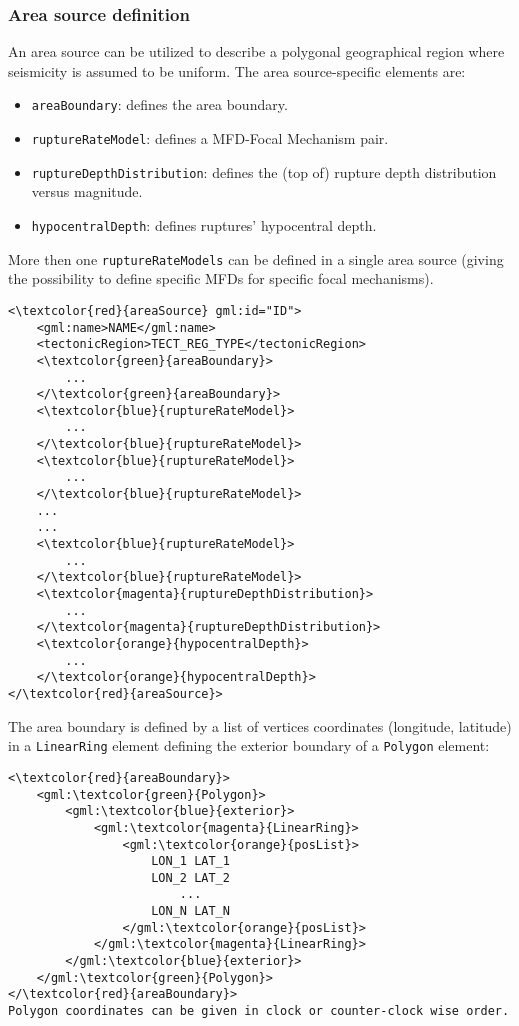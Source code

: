 \subsubsection{Area source definition}
An area source can be utilized to describe a polygonal geographical region where seismicity is assumed to be uniform. The area source-specific elements are:
\begin{itemize}
\item \Verb+areaBoundary+: defines the area boundary.
\item \Verb+ruptureRateModel+: defines a MFD-Focal Mechanism pair.
\item \Verb+ruptureDepthDistribution+: defines the (top of) rupture depth distribution versus magnitude.
\item \Verb+hypocentralDepth+: defines ruptures' hypocentral depth.
\end{itemize}
More then one \Verb+ruptureRateModels+ can be defined in a single area source (giving the possibility to define specific MFDs for specific focal mechanisms).
\begin{Verbatim}[frame=single, commandchars=\\\{\},fontsize=\normalsize, samepage=true]
<\textcolor{red}{areaSource} gml:id="ID">
	<gml:name>NAME</gml:name>
	<tectonicRegion>TECT_REG_TYPE</tectonicRegion>
	<\textcolor{green}{areaBoundary}>
		...
	</\textcolor{green}{areaBoundary}>
	<\textcolor{blue}{ruptureRateModel}>
		...
	</\textcolor{blue}{ruptureRateModel}>
	<\textcolor{blue}{ruptureRateModel}>
		...
	</\textcolor{blue}{ruptureRateModel}>
	...
	...
	<\textcolor{blue}{ruptureRateModel}>
		...
	</\textcolor{blue}{ruptureRateModel}>
	<\textcolor{magenta}{ruptureDepthDistribution}>
		...
	</\textcolor{magenta}{ruptureDepthDistribution}>
	<\textcolor{orange}{hypocentralDepth}>
		...	
	</\textcolor{orange}{hypocentralDepth}>
</\textcolor{red}{areaSource}>
\end{Verbatim}
The area boundary is defined by a list of vertices coordinates (longitude, latitude) in a \Verb+LinearRing+ element defining the exterior boundary of a \Verb+Polygon+ element:
\begin{Verbatim}[frame=single, commandchars=\\\{\},fontsize=\normalsize, samepage=true]
<\textcolor{red}{areaBoundary}>
	<gml:\textcolor{green}{Polygon}>
		<gml:\textcolor{blue}{exterior}>
			<gml:\textcolor{magenta}{LinearRing}>
				<gml:\textcolor{orange}{posList}>
					LON_1 LAT_1
					LON_2 LAT_2
						...			
					LON_N LAT_N
				</gml:\textcolor{orange}{posList}>
			</gml:\textcolor{magenta}{LinearRing}>
		</gml:\textcolor{blue}{exterior}>
	</gml:\textcolor{green}{Polygon}>
</\textcolor{red}{areaBoundary}>
Polygon coordinates can be given in clock or counter-clock wise order.
\end{Verbatim}
